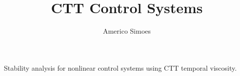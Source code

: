 \documentclass[12pt]{article}
\begin{document}
\title{CTT Control Systems}
\author{Americo Simoes}
\maketitle
Stability analysis for nonlinear control systems using CTT temporal viscosity.
\end{document}
